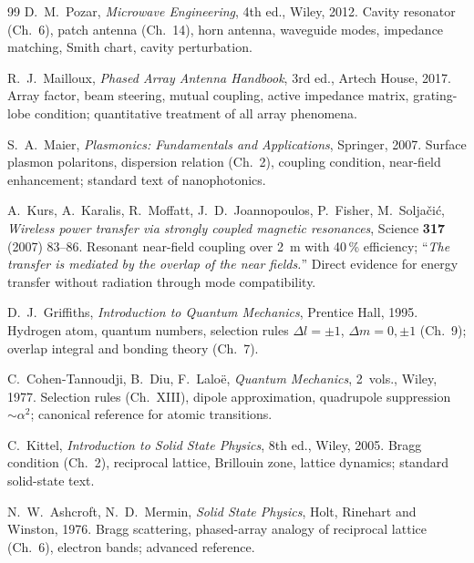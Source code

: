 \begin{thebibliography}{99}
D.~M.~Pozar,
\textit{Microwave Engineering},
4th ed., Wiley, 2012.
Cavity resonator (Ch.~6), patch antenna (Ch.~14), horn antenna,
waveguide modes, impedance matching, Smith chart, cavity perturbation.

R.~J.~Mailloux,
\textit{Phased Array Antenna Handbook},
3rd ed., Artech House, 2017.
Array factor, beam steering, mutual coupling, active impedance matrix,
grating-lobe condition; quantitative treatment of all array phenomena.

S.~A.~Maier,
\textit{Plasmonics: Fundamentals and Applications},
Springer, 2007.
Surface plasmon polaritons, dispersion relation (Ch.~2), coupling condition,
near-field enhancement; standard text of nanophotonics.

A.~Kurs, A.~Karalis, R.~Moffatt, J.~D.~Joannopoulos,
P.~Fisher, M.~Solja\v{c}i\'{c},
\textit{Wireless power transfer via strongly coupled magnetic resonances},
Science \textbf{317} (2007) 83--86.
Resonant near-field coupling over 2~m with 40\,\% efficiency;
``\textit{The transfer is mediated by the overlap of the near fields.}''
Direct evidence for energy transfer without radiation through mode
compatibility.


D.~J.~Griffiths,
\textit{Introduction to Quantum Mechanics},
Prentice Hall, 1995.
Hydrogen atom, quantum numbers, selection rules $\Delta l=\pm1$,
$\Delta m=0,\pm1$ (Ch.~9); overlap integral and bonding theory (Ch.~7).

C.~Cohen-Tannoudji, B.~Diu, F.~Lalo\"e,
\textit{Quantum Mechanics}, 2~vols.,
Wiley, 1977.
Selection rules (Ch.~XIII), dipole approximation, quadrupole suppression
$\sim\alpha^2$; canonical reference for atomic transitions.


C.~Kittel,
\textit{Introduction to Solid State Physics},
8th ed., Wiley, 2005.
Bragg condition (Ch.~2), reciprocal lattice, Brillouin zone, lattice
dynamics; standard solid-state text.

N.~W.~Ashcroft, N.~D.~Mermin,
\textit{Solid State Physics},
Holt, Rinehart and Winston, 1976.
Bragg scattering, phased-array analogy of reciprocal lattice (Ch.~6),
electron bands; advanced reference.



\end{thebibliography}
